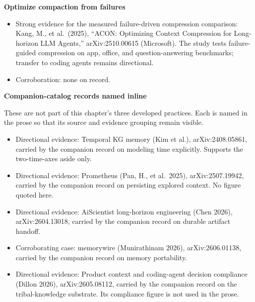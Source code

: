 \textbf{Optimize compaction from failures}

\begin{itemize}
\tightlist
\item
  Strong evidence for the measured failure-driven compression comparison: Kang, M., et al.~(2025), ``ACON: Optimizing Context Compression for Long-horizon LLM Agents,'' arXiv:2510.00615 (Microsoft). The study tests failure-guided compression on app, office, and question-answering benchmarks; transfer to coding agents remains directional.
\item
  Corroboration: none on record.
\end{itemize}

\textbf{Companion-catalog records named inline}

These are not part of this chapter's three developed practices. Each is named in the prose so that its source and evidence grouping remain visible.

\begin{itemize}
\tightlist
\item
  Directional evidence: Temporal KG memory (Kim et al.), arXiv:2408.05861, carried by the companion record on modeling time explicitly. Supports the two-time-axes aside only.
\item
  Directional evidence: Prometheus (Pan, H., et al.~2025), arXiv:2507.19942, carried by the companion record on persisting explored context. No figure quoted here.
\item
  Directional evidence: AiScientist long-horizon engineering (Chen 2026), arXiv:2604.13018, carried by the companion record on durable artifact handoff.
\item
  Corroborating case: memorywire (Munirathinam 2026), arXiv:2606.01138, carried by the companion record on memory portability.
\item
  Directional evidence: Product context and coding-agent decision compliance (Dillon 2026), arXiv:2605.08112, carried by the companion record on the tribal-knowledge substrate. Its compliance figure is not used in the prose.
\end{itemize}
